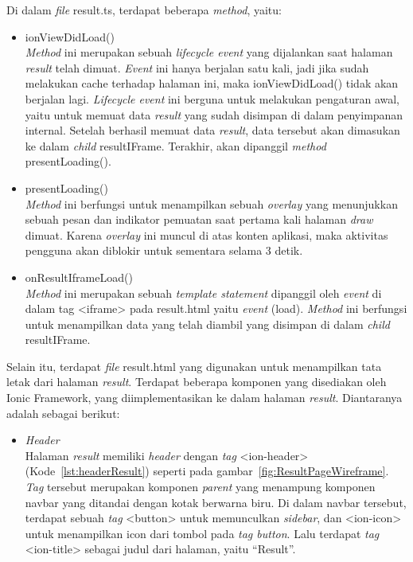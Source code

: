 \begin{itemize}
	Di dalam \textit{file} result.ts, terdapat beberapa \textit{method}, yaitu:
	
	\begin{itemize}
		\item ionViewDidLoad() \\
		\textit{Method} ini merupakan sebuah \textit{lifecycle event} yang dijalankan saat halaman \textit{result} telah dimuat. \textit{Event} ini hanya berjalan satu kali, jadi jika sudah melakukan cache terhadap halaman ini, maka ionViewDidLoad() tidak akan berjalan lagi. \textit{Lifecycle event} ini berguna untuk melakukan pengaturan awal, yaitu untuk memuat data \textit{result} yang sudah disimpan di dalam penyimpanan internal. Setelah berhasil memuat data \textit{result}, data tersebut akan dimasukan ke dalam \textit{child} resultIFrame. Terakhir, akan dipanggil \textit{method} presentLoading().
		\item presentLoading() \\
		\textit{Method} ini berfungsi untuk menampilkan sebuah \textit{overlay} yang menunjukkan sebuah pesan dan indikator pemuatan saat pertama kali halaman \textit{draw} dimuat. Karena \textit{overlay} ini muncul di atas konten aplikasi, maka aktivitas pengguna akan diblokir untuk sementara selama 3 detik. 
		\item onResultIframeLoad() \\
		\textit{Method} ini merupakan sebuah \textit{template statement} dipanggil oleh \textit{event} di dalam tag <iframe> pada result.html yaitu \textit{event} (load). \textit{Method} ini berfungsi untuk menampilkan data yang telah diambil yang disimpan di dalam \textit{child} resultIFrame.
	\end{itemize}
	
	Selain itu, terdapat \textit{file} result.html yang digunakan untuk menampilkan tata letak dari halaman \textit{result}. Terdapat beberapa komponen yang disediakan oleh Ionic Framework, yang diimplementasikan ke dalam halaman \textit{result}. Diantaranya adalah sebagai berikut:
	
\newpage	
	
	\begin{itemize}
		\item \textit{Header} \\
		Halaman \textit{result} memiliki \textit{header} dengan \textit{tag} <ion-header> (Kode~\ref{lst:headerResult}) seperti pada gambar~\ref{fig:ResultPageWireframe}. \textit{Tag} tersebut merupakan komponen \textit{parent} yang menampung komponen navbar yang ditandai dengan kotak berwarna biru. Di dalam navbar tersebut, terdapat sebuah \textit{tag} <button> untuk memunculkan \textit{sidebar}, dan <ion-icon> untuk menampilkan icon dari tombol pada \textit{tag button}. Lalu terdapat \textit{tag} <ion-title> sebagai judul dari halaman, yaitu ``Result''.


\end{itemize}
\end{itemize}
